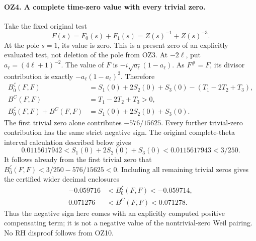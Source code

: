 \paragraph{OZ4. A complete time-zero value with every trivial zero.}
Take the fixed original test
\[
 F(s)=F_0(s)+F_1(s)=Z(s)^{-1}+Z(s)^{-3}.           \tag{OZ7}
\]
At the pole \(s=1\), its value is zero. This is a present
zero of an explicitly evaluated test, not deletion of the pole
from OZ3. At \(-2\ell\), put \(a_\ell=(4\ell+1)^{-2}\).
The value of \(F\) is \(-i\sqrt{a_\ell}(1-a_\ell)\).
As \(F^\#=F\), its divisor contribution is exactly
\(-a_\ell(1-a_\ell)^2\). Therefore
\[
 \begin{split}
 B_0^\zeta(F,F)
   &=S_1(0)+2S_2(0)+S_3(0)
                  -(T_1-2T_2+T_3),\\
 B^C(F,F)&=T_1-2T_2+T_3>0,\\
 B_0^\zeta(F,F)+B^C(F,F)
   &=S_1(0)+2S_2(0)+S_3(0).
 \end{split}\tag{OZ8}
\]
The first trivial zero alone contributes \(-576/15625\).
Every further trivial-zero contribution has the same strict
negative sign. The original complete-theta interval calculation
described below gives
\[
 0.0115617942<S_1(0)+2S_2(0)+S_3(0)<0.0115617943<3/250.
                                                               \tag{OZ9}
\]
It follows already from the first trivial zero that
\(B_0^\zeta(F,F)<3/250-576/15625<0\).
Including all remaining trivial zeros gives the certified wider
decimal enclosures
\[
 \begin{split}
 -0.059716&<B_0^\zeta(F,F)<-0.059714,\\
 0.071276&<B^C(F,F)<0.071278.
 \end{split}\tag{OZ10}
\]
Thus the negative sign here comes with an explicitly computed
positive compensating term; it is not a negative value of the
nontrivial-zero Weil pairing. No RH disproof follows from OZ10.

